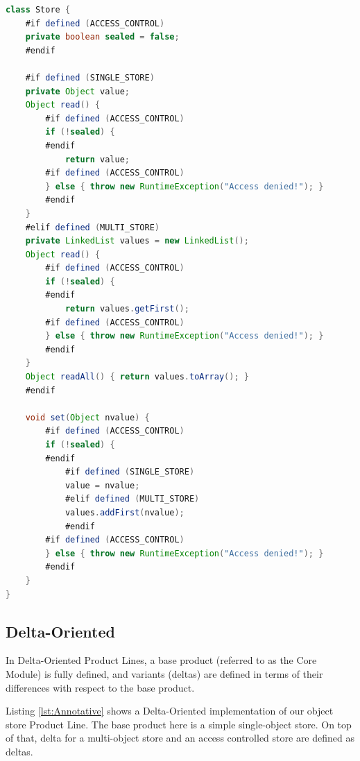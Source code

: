\documentclass[11pt]{article}
\begin{document}

\begin{lstlisting}[language=Java, caption=Annotative example, label={lst:Annotative}]
class Store {
	#if defined (ACCESS_CONTROL)
	private boolean sealed = false;
	#endif

	#if defined (SINGLE_STORE)
	private Object value;
	Object read() {
		#if defined (ACCESS_CONTROL)
 		if (!sealed) {
		#endif
			return value;
		#if defined (ACCESS_CONTROL)
		} else { throw new RuntimeException("Access denied!"); }
		#endif 
	}
	#elif defined (MULTI_STORE)
	private LinkedList values = new LinkedList();
	Object read() { 
		#if defined (ACCESS_CONTROL)
 		if (!sealed) {
		#endif
			return values.getFirst(); 
		#if defined (ACCESS_CONTROL)
		} else { throw new RuntimeException("Access denied!"); }
		#endif
	}
	Object readAll() { return values.toArray(); }
	#endif
	
	void set(Object nvalue) {
		#if defined (ACCESS_CONTROL)
 		if (!sealed) {
		#endif
			#if defined (SINGLE_STORE)
			value = nvalue;
			#elif defined (MULTI_STORE)
			values.addFirst(nvalue);
			#endif
		#if defined (ACCESS_CONTROL)
		} else { throw new RuntimeException("Access denied!"); }
		#endif
	}
}
\end{lstlisting}

\subsection{Delta-Oriented}

In Delta-Oriented \cite{Schaefer} Product Lines, a base product (referred to as the Core Module) is fully defined, and variants (deltas) are defined in terms of their differences with respect to the base product. 

Listing \ref{lst:Annotative} shows a Delta-Oriented implementation of our object store Product Line. The base product here is a simple single-object store. On top of that, delta for a multi-object store and an access controlled store are defined as deltas. 
 
\end{document}
